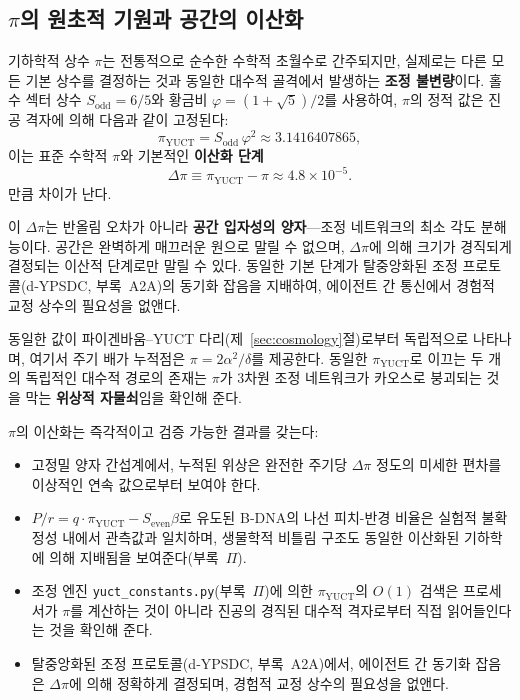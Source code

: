 \documentclass[12pt,a4paper]{article}
\theoremstyle{remark}
\begin{document}
	\subsection{\(\pi\)의 원초적 기원과 공간의 이산화}
	
	기하학적 상수 \(\pi\)는 전통적으로 순수한 수학적 초월수로 간주되지만, 실제로는 다른 모든 기본 상수를 결정하는 것과 동일한 대수적 골격에서 발생하는 \textbf{조정 불변량}이다. 홀수 섹터 상수 \(S_{\mathrm{odd}}=6/5\)와 황금비 \(\varphi = (1+\sqrt{5})/2\)를 사용하여, \(\pi\)의 정적 값은 진공 격자에 의해 다음과 같이 고정된다:
	\[
	\boxed{\pi_{\mathrm{YUCT}} = S_{\mathrm{odd}}\,\varphi^{2}
		\approx 3.1416407865},
	\]
	이는 표준 수학적 \(\pi\)와 기본적인 \textbf{이산화 단계}
	\[
	\Delta\pi \equiv \pi_{\mathrm{YUCT}} - \pi \approx 4.8 \times 10^{-5}.
	\]
	만큼 차이가 난다.
	
	이 \(\Delta\pi\)는 반올림 오차가 아니라 \textbf{공간 입자성의 양자}—조정 네트워크의 최소 각도 분해능이다. 공간은 완벽하게 매끄러운 원으로 말릴 수 없으며, \(\Delta\pi\)에 의해 크기가 경직되게 결정되는 이산적 단계로만 말릴 수 있다. 동일한 기본 단계가 탈중앙화된 조정 프로토콜(d‑YPSDC, 부록~A2A)의 동기화 잡음을 지배하여, 에이전트 간 통신에서 경험적 교정 상수의 필요성을 없앤다.
	
	동일한 값이 파이겐바움–YUCT 다리(제~\ref{sec:cosmology}절)로부터 독립적으로 나타나며, 여기서 주기 배가 누적점은 \(\pi = 2\alpha^2/\delta\)를 제공한다. 동일한 \(\pi_{\mathrm{YUCT}}\)로 이끄는 두 개의 독립적인 대수적 경로의 존재는 \(\pi\)가 3차원 조정 네트워크가 카오스로 붕괴되는 것을 막는 \textbf{위상적 자물쇠}임을 확인해 준다.
	
	\(\pi\)의 이산화는 즉각적이고 검증 가능한 결과를 갖는다:
	\begin{itemize}
		\item 고정밀 양자 간섭계에서, 누적된 위상은 완전한 주기당 \(\Delta\pi\) 정도의 미세한 편차를 이상적인 연속 값으로부터 보여야 한다.
		\item \(P/r = q\cdot\pi_{\mathrm{YUCT}} - S_{\mathrm{even}}\beta\)로 유도된 B‑DNA의 나선 피치-반경 비율은 실험적 불확정성 내에서 관측값과 일치하며, 생물학적 비틀림 구조도 동일한 이산화된 기하학에 의해 지배됨을 보여준다(부록~\(\Pi\)).
		\item 조정 엔진 \texttt{yuct\_constants.py}(부록~\(\Pi\))에 의한 \(\pi_{\mathrm{YUCT}}\)의 \(O(1)\) 검색은 프로세서가 \(\pi\)를 계산하는 것이 아니라 진공의 경직된 대수적 격자로부터 직접 읽어들인다는 것을 확인해 준다.
		\item 탈중앙화된 조정 프로토콜(d‑YPSDC, 부록~A2A)에서, 에이전트 간 동기화 잡음은 \(\Delta\pi\)에 의해 정확하게 결정되며, 경험적 교정 상수의 필요성을 없앤다.
	\end{itemize}
	
\end{document}
